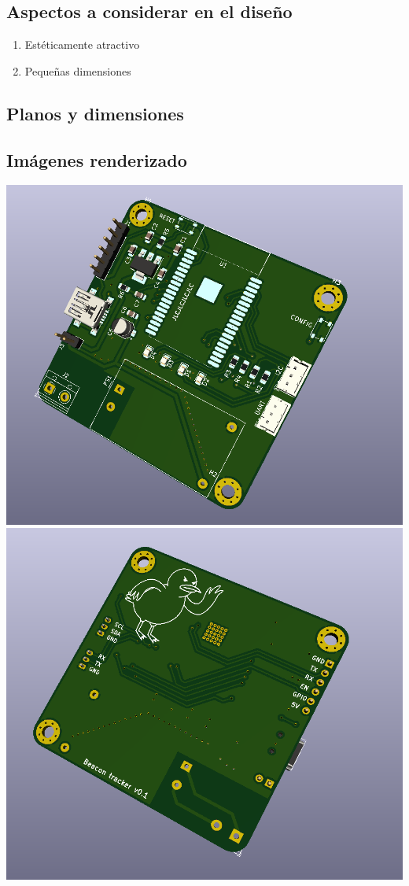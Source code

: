 \documentclass[a4paper ,12pt, onecolumn]{article}
\begin{document}
    \subsection{Aspectos a considerar en el diseño}
        \begin{enumerate}
            \item Estéticamente atractivo
            \item Pequeñas dimensiones
        \end{enumerate}
    \subsection{Planos y dimensiones}
    \subsection{Imágenes renderizado}   
        \includegraphics[scale=0.2]{../receiver_1.PNG}
        \includegraphics[scale=0.4]{../receiver_2.PNG}
\end{document}
